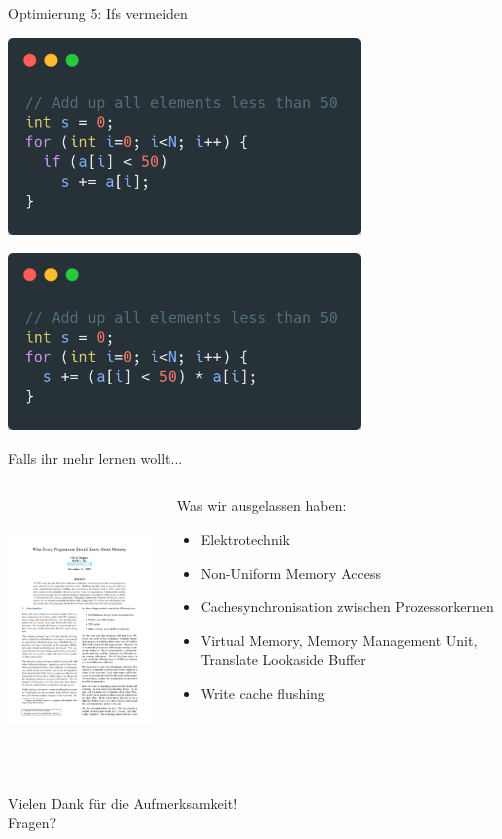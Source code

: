 \documentclass{beamer}
\begin{document}
\begin{frame}[t]{Optimierung 5: Ifs vermeiden}
  \centerline{\includegraphics[width=0.7\textwidth]{branchless1.png}}
  \pause
  \centerline{\includegraphics[width=0.7\textwidth]{branchless2.png}}
\end{frame}

\begin{frame}{Falls ihr mehr lernen wollt...}
\begin{columns}
    \begin{column}{0.48\textwidth}
        \centerline{\includegraphics[height=7cm]{paper.png}}
    \end{column}
    \pause
    \begin{column}{0.48\textwidth}
        Was wir ausgelassen haben:
        \begin{itemize}
            \item Elektrotechnik
            \item Non-Uniform Memory Access
            \item Cachesynchronisation zwischen Prozessorkernen
            \item Virtual Memory, Memory Management Unit, Translate Lookaside Buffer
            \item Write cache flushing
        \end{itemize}
    \end{column}
\end{columns}
\end{frame}

\begin{frame}
\centering
{\Huge
Vielen Dank f\"ur die Aufmerksamkeit!
}\\
Fragen?
\end{frame}
\end{document}
